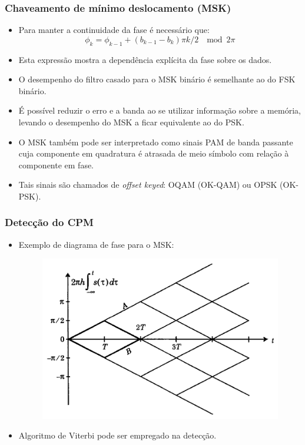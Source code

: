 \begin{frame}
	\frametitle{Chaveamento de mínimo deslocamento (MSK)}

	\begin{itemize}	   
	    \item Para manter a continuidade da fase é necessário que:
	    \begin{equation*}
		\phi_k = \phi_{k-1} + (b_{k-1} - b_k)\pi k/2 \; \mod 2\pi
	    \end{equation*}
	    \item Esta expressão mostra a dependência explícita da fase sobre os dados.
	    \item O desempenho do filtro casado para o MSK binário é semelhante ao do FSK binário.
	    \item É possível reduzir o erro e a banda ao se utilizar informação sobre a memória, levando o desempenho do MSK a ficar equivalente ao do PSK.
	    \item O MSK também pode ser interpretado como sinais PAM de banda passante cuja componente em quadratura é atrasada de meio símbolo com relação à componente em fase.
	    \item Tais sinais são chamados de \textit{offset keyed}: OQAM (OK-QAM) ou OPSK (OK-PSK).
	\end{itemize}	 
\end{frame}

\begin{frame}
	\frametitle{Detecção do CPM}

	\begin{itemize}	   
	    \item Exemplo de diagrama de fase para o MSK:
	    \begin{figure}[t]	
		\begin{center}
		\includegraphics[width=0.65\columnwidth]{figs/adv_27}
		\end{center}
	    \end{figure}
	    \item Algoritmo de Viterbi pode ser empregado na detecção.
	\end{itemize}	 
\end{frame}

